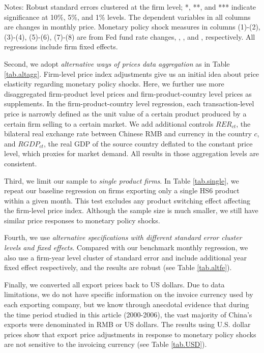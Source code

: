 \begin{table}[htbp]
{\begin{threeparttable}
\begin{tabular}{lcccccccc}
        \bottomrule
    \end{tabular}
        \begin{tablenotes}
            \footnotesize
            \item Notes: Robust standard errors clustered at the firm level;  *, **, and *** indicate significance at 10\%, 5\%, and 1\% levels. The dependent variables in all columns are changes in monthly price. Monetary policy shock measures in columns (1)-(2), (3)-(4), (5)-(6), (7)-(8) are from Fed fund rate changes, \cite{nakamura2018high}, \cite{acosta2022perceived}, and \cite{jarocinski2020deconstructing}, respectively. All regressions include firm fixed effects.
	\end{tablenotes}
    \end{threeparttable}
    }
    \label{tab.altmps}
\end{table}

Second, we adopt \textit{alternative ways of prices data aggregation} as in Table \ref{tab.altagg}. Firm-level price index adjustments give us an initial idea about price elasticity regarding monetary policy shocks. Here, we further use more disaggregated firm-product level prices and firm-product-country level prices as supplements. In the firm-product-country level regression, each transaction-level price is narrowly defined as the unit value of a certain product produced by a certain firm selling to a certain market. We add additional controls $RER_{ct}$, the bilateral real exchange rate between Chinese RMB and currency in the country $c$, and $RGDP_{ct}$, the real GDP of the source country deflated to the constant price level, which proxies for market demand. All results in those aggregation levels are consistent. 

Third, we limit our sample to \textit{single product firms}. In Table \ref{tab.single}, we repeat our baseline regression on firms exporting only a single HS6 product within a given month. This test excludes any product switching effect affecting the firm-level price index. Although the sample size is much smaller, we still have similar price responses to monetary policy shocks. 

Fourth, we use \textit{alternative specifications with different standard error cluster levels and fixed effects}. Compared with our benchmark monthly regression, we also use a firm-year level cluster of standard error and include additional year fixed effect respectively, and the results are robust (see Table \ref{tab.altfe}).

Finally, we converted all export prices back to US dollars. Due to data limitations, we do not have specific information on the invoice currency used by each exporting company, but we know through anecdotal evidence that during the time period studied in this article (2000-2006), the vast majority of China's exports were denominated in RMB or US dollars. The results using U.S. dollar prices show that export price adjustments in response to monetary policy shocks are not sensitive to the invoicing currency (see Table \ref{tab.USD}).



